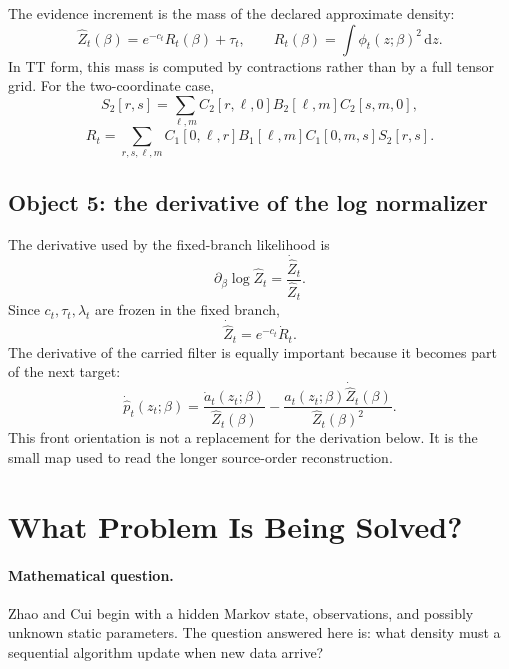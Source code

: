 \documentclass[11pt]{article}
\numberwithin{equation}{section}
\newcommand{\dd}{\,\mathrm d}
\begin{document}
The evidence increment is the mass of the declared approximate density:
\begin{equation}
    \widehat Z_t(\beta)
    =
    e^{-c_t}R_t(\beta)+\tau_t,
    \qquad
    R_t(\beta)=\int\phi_t(z;\beta)^2\dd z.
    \label{eq:p24-p22-o13}
\end{equation}
In TT form, this mass is computed by contractions rather than by a full tensor
grid.  For the two-coordinate case,
\begin{equation}
    S_2[r,s]
    =
    \sum_{\ell,m}
    C_2[r,\ell,0]B_2[\ell,m]C_2[s,m,0],
    \label{eq:p24-p22-o14}
\end{equation}
\begin{equation}
    R_t
    =
    \sum_{r,s,\ell,m}
    C_1[0,\ell,r]B_1[\ell,m]C_1[0,m,s]S_2[r,s].
    \label{eq:p24-p22-o15}
\end{equation}

\subsection*{Object 5: the derivative of the log normalizer}

The derivative used by the fixed-branch likelihood is
\begin{equation}
    \partial_\beta\log\widehat Z_t
    =
    \frac{\dot{\widehat Z}_t}{\widehat Z_t}.
    \label{eq:p24-p22-o16}
\end{equation}
Since \(c_t,\tau_t,\lambda_t\) are frozen in the fixed branch,
\begin{equation}
    \dot{\widehat Z}_t=e^{-c_t}\dot R_t.
    \label{eq:p24-p22-o17}
\end{equation}
The derivative of the carried filter is equally important because it becomes
part of the next target:
\begin{equation}
    \dot{\widehat p}_t(z_t;\beta)
    =
    \frac{\dot a_t(z_t;\beta)}{\widehat Z_t(\beta)}
    -
    \frac{a_t(z_t;\beta)\dot{\widehat Z}_t(\beta)}
    {\widehat Z_t(\beta)^2}.
    \label{eq:p24-p22-o18}
\end{equation}
This front orientation is not a replacement for the derivation below.  It is
the small map used to read the longer source-order reconstruction.

\section{What Problem Is Being Solved?}

\paragraph{Mathematical question.}
Zhao and Cui \cite{zhao2024ttsequential} begin with a hidden Markov state, observations, and possibly unknown
static parameters.  The question answered here is: what density must a
sequential algorithm update when new data arrive?
\end{document}
